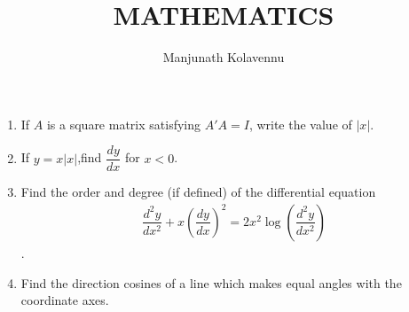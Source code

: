 \documentclass[12pt,letterpaper]{article}
\title{\textbf{MATHEMATICS}}
\author{Manjunath Kolavennu}
\newcommand{\mydet}[1]{\left| #1 \right|}
\newcommand{\brak}[1]{\left( #1 \right)}
\begin{document}
\maketitle

\begin{enumerate}
\section*{SECTION-A}
\item If $A$ is a square matrix satisfying $A'A = I$, write the value of $\mydet{x}$.
\item If $y=x\mydet{x}$,find $\dfrac{dy}{dx}$ for $x<0$.
\item  Find the order and degree (if defined) of the differential equation 
 \begin{align*}
 \dfrac{d^2y}{dx^2}+x\brak{\dfrac{dy}{dx}}^2=2x^2\log\brak{\dfrac{d^2y}{dx^2}}
 \end{align*}.
\item Find the direction cosines of a line which makes equal angles with the coordinate axes.

\end{enumerate}
\end{document}
